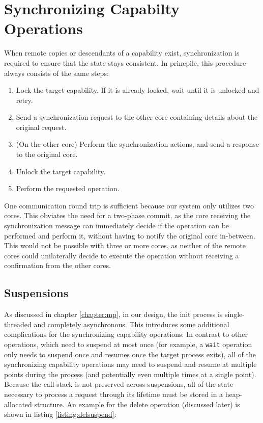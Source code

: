 \section{Synchronizing Capabilty Operations}
\label{section:cap:sync}
When remote copies or descendants of a capability exist, synchronization is required to ensure that the state stays consistent. In princpile, this procedure always consists of the same steps:
\begin{enumerate}
    \item Lock the target capability. If it is already locked, wait until it is unlocked and retry.
    \item Send a synchronization request to the other core containing details about the original request.
    \item (On the other core) Perform the synchronization actions, and send a response to the original core.
    \item Unlock the target capability.
    \item Perform the requested operation.
\end{enumerate}

One communication round trip is sufficient because our system only utilizes two cores. This obviates the need for a two-phase commit, as the core receiving the synchronization message can immediately decide if the operation can be performed and perform it, without having to notify the original core in-between. This would not be possible with three or more cores, as neither of the remote cores could unilaterally decide to execute the operation without receiving a confirmation from the other cores.

\subsection{Suspensions}
As discussed in chapter \ref{chapter:mp}, in our design, the init process is single-threaded and completely asynchronous. This introduces some additional complications for the synchronizing capability operations: In contrast to other operations, which need to suspend at most once (for example, a \texttt{wait} operation only needs to suspend once and resumes once the target process exits), all of the synchronizing capability operations may need to suspend and resume at multiple points during the process (and potentially even multiple times at a single point). Because the call stack is not preserved across suspensions, all of the state necessary to process a request through its lifetime must be stored in a heap-allocated structure. An example for the delete operation (discussed later) is shown in listing \ref{listing:delsuspend}:

